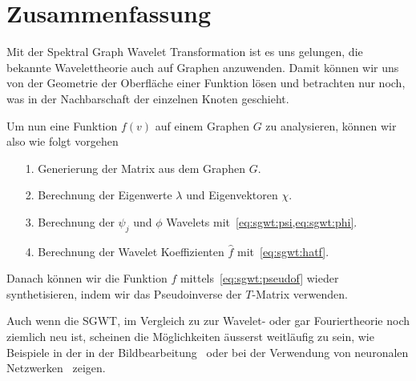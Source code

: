 
\section{Zusammenfassung\label{sec:sgwt:summary}}

Mit der Spektral Graph Wavelet Transformation ist es uns gelungen, die bekannte 
Wavelettheorie auch auf Graphen anzuwenden. Damit k\"onnen wir uns von der 
Geometrie der Oberfl\"ache einer Funktion l\"osen und betrachten nur noch, was 
in der Nachbarschaft der einzelnen Knoten geschieht.

Um nun eine Funktion $f(v)$ auf einem Graphen $G$ zu analysieren, k\"onnen wir 
also wie folgt vorgehen
\begin{itemize}
    \item[1.] Generierung der \laplaceL{} Matrix aus dem Graphen $G$.
    \item[2.] Berechnung der Eigenwerte $\lambda$ und Eigenvektoren $\chi$.
    \item[3.] Berechnung der $\psi_j$ und $\phi$ Wavelets 
    mit~\cref{eq:sgwt:psi,eq:sgwt:phi}.
    \item[4.] Berechnung der Wavelet Koeffizienten $\hat{f}$ 
    mit~\cref{eq:sgwt:hatf}.
\end{itemize}
Danach k\"onnen wir die Funktion $f$ mittels~\cref{eq:sgwt:pseudof} wieder 
synthetisieren, indem wir das Pseudoinverse der $T$-Matrix verwenden.

Auch wenn die SGWT, im Vergleich zu zur Wavelet- oder gar Fouriertheorie noch 
ziemlich neu ist, scheinen die M\"oglichkeiten \"ausserst weitl\"aufig zu sein, 
wie Beispiele in der in der Bildbearbeitung~\cite{shuman_emerging_2013} oder 
bei der Verwendung von neuronalen Netzwerken~\cite{xu_graph_2019} zeigen.

